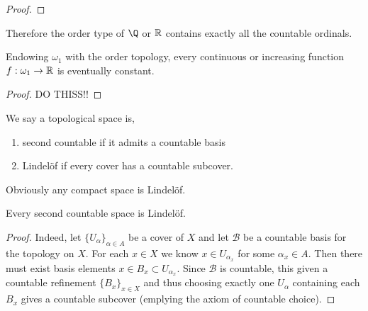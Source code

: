 \documentclass[12pt]{article}
\begin{document}
\begin{proof}
  
\end{proof}

\begin{rmk}
Therefore the order type of $\Q$ or $\mathbb{R}$ contains exactly all the countable ordinals.
\end{rmk}

\begin{prop}
Endowing $\omega_1$ with the order topology, every continuous or increasing function $f : \omega_1 \to \mathbb{R}$ is eventually constant.
\end{prop}

\begin{proof}
DO THISS!!
\end{proof}

\begin{defn}
We say a topological space is,
\begin{enumerate}
\item second countable if it admits a countable basis
\item Lindel\"{o}f if every cover has a countable subcover.
\end{enumerate}
\end{defn}

\begin{rmk}
Obviously any compact space is Lindel\"{o}f.
\end{rmk}

\begin{lemma}
Every second countable space is Lindel\"{o}f.
\end{lemma}

\begin{proof}
Indeed, let $\{ U_\alpha \}_{\alpha \in A}$ be a cover of $X$ and let $\mathcal{B}$ be a countable basis for the topology on $X$. For each $x \in X$ we know $x \in U_{\alpha_x}$ for some $\alpha_x \in A$. Then there must exist basis elements $x \in B_x \subset U_{\alpha_x}$. Since $\mathcal{B}$ is countable, this given a countable refinement $\{ B_x \}_{x \in X}$ and thus choosing exactly one $U_\alpha$ containing each $B_x$ gives a countable subcover (emplying the axiom of countable choice).
\end{proof}
\end{document}
